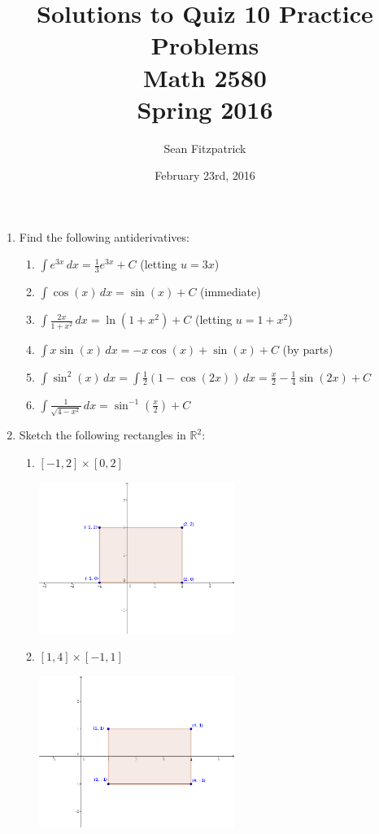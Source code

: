 \documentclass[letterpaper,12pt]{article}
\title{Solutions to Quiz 10 Practice Problems\\Math 2580\\Spring 2016}
\author{Sean Fitzpatrick}
\date{February 23rd, 2016}
\newcommand{\R}{\mathbb{R}}
\newcommand{\di}{\displaystyle}
\begin{document}
 \maketitle
\begin{enumerate}
 \item Find the following antiderivatives:
\begin{enumerate}
 \item $\di \int e^{3x}\,dx = \frac{1}{3}e^{3x}+C$ (letting $u=3x$)
 \item $\di \int \cos(x)\,dx = \sin(x)+C$ (immediate)
 \item $\di \int \frac{2x}{1+x^2}\,dx = \ln(1+x^2)+C$ (letting $u=1+x^2$)
 \item $\di \int x\sin(x)\,dx = -x\cos(x)+\sin(x)+C $ (by parts)
 \item $\di \int \sin^2(x)\,dx = \int \frac{1}{2}(1-\cos(2x))\,dx = \frac{x}{2}-\frac{1}{4}\sin(2x)+C$
 \item $\di \int \frac{1}{\sqrt{4-x^2}}\,dx = \sin^{-1}\left(\frac{x}{2}\right)+C$
\end{enumerate}

 \item Sketch the following rectangles in $\R^2$:\label{a}
\begin{multicols}{2}
\begin{enumerate}
 \item $[-1,2]\times [0,2]$

\begin{center}
 \includegraphics[width=2.5in]{Q10-2a.png}
\end{center}



 \item $[1,4]\times [-1,1]$

\begin{center}
 \includegraphics[width=2.5in]{Q10-2b.png}
\end{center}


\end{enumerate}
\end{multicols}
\end{enumerate}
\end{document}
